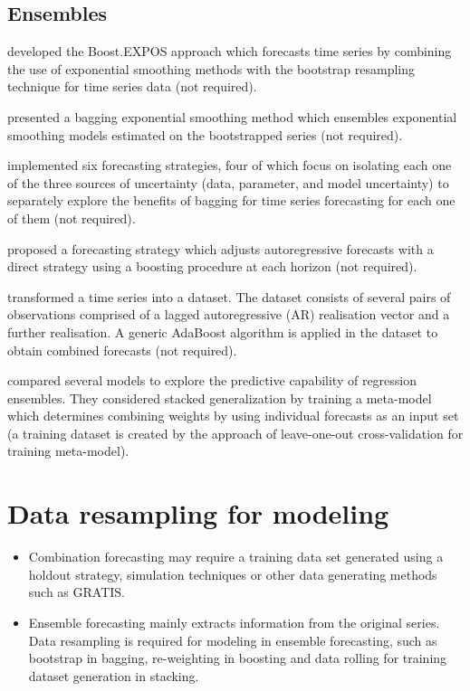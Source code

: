 \documentclass[11pt]{article}
\begin{document}
\subsection{Ensembles}

\cite{cordeiro2009forecasting} developed the Boost.EXPOS approach which forecasts time series by combining the use of exponential smoothing methods with the bootstrap resampling technique for time series data (not required).

\cite{bergmeir2016bagging} presented a bagging exponential smoothing method which ensembles exponential smoothing models estimated on the bootstrapped series (not required).

\cite{petropoulos2018exploring} implemented six forecasting strategies, four of which focus on isolating each one of the three sources of uncertainty (data, parameter, and model uncertainty) to separately explore the benefits of bagging for time series forecasting for each one of them (not required).

\cite{taieb2014boosting} proposed a forecasting strategy which adjusts autoregressive forecasts with a direct strategy using a boosting procedure at each horizon (not required).

\cite{barrow2016comparison} transformed a time series into a dataset. The dataset consists of several pairs of observations comprised of a lagged autoregressive (AR) realisation vector and a further realisation. A generic AdaBoost algorithm is applied in the dataset to obtain combined forecasts (not required).

\cite{ribeiro2020ensemble} compared several models to explore the predictive capability of regression ensembles. They considered stacked generalization by training a meta-model which determines combining weights by using individual forecasts as an input set (a training dataset is created by the approach of leave-one-out cross-validation for training meta-model).


\section{Data resampling for modeling}
\begin{itemize}
\item Combination forecasting may require a training data set generated using a holdout strategy, simulation techniques or other data generating methods such as GRATIS.
\item Ensemble forecasting mainly extracts information from the original series. Data resampling is required for modeling in ensemble forecasting, such as bootstrap in bagging, re-weighting in boosting and data rolling for training dataset generation in stacking.
\end{itemize}
\end{document}
